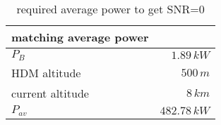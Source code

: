 \begin{table}[H]
\centering
\caption{required average power to get SNR=0}
\label{tab:p_av_matching}
\begin{tabular}{|l|r|}\hline
    \textbf{matching average power} & \\
    \hline 
    $P_B$ & $1.89\,k W$ \\
    HDM altitude & $500\,m$ \\
    current altitude & $8\,km$ \\
    $P_{av}$ & $482.78\,k W$ \\
    \hline 
\end{tabular}
\end{table}

